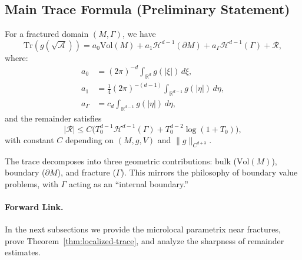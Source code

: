 \bigskip


\subsection{Main Trace Formula (Preliminary Statement)}

\begin{theorem}
\label{thm:localized-trace}
For a fractured domain $(M,\Gamma)$, we have
\[
\mathrm{Tr}(g(\sqrt{\mathcal{A}}))
= a_0 \mathrm{Vol}(M) + a_1 \mathcal{H}^{d-1}(\partial M)
+ a_\Gamma \mathcal{H}^{d-1}(\Gamma) + \mathcal{R},
\]
where:
\begin{align*}
a_0 &= (2\pi)^{-d} \int_{\mathbb{R}^d} g(|\xi|)\,d\xi, \\
a_1 &= \tfrac{1}{4}(2\pi)^{-(d-1)} \int_{\mathbb{R}^{d-1}} g(|\eta|)\,d\eta, \\
a_\Gamma &= c_d \int_{\mathbb{R}^{d-1}} g(|\eta|)\,d\eta,
\end{align*}
and the remainder satisfies
\[
|\mathcal{R}| \leq C\big(
T_0^{d-1} \mathcal{H}^{d-1}(\Gamma)
+ T_0^{d-2}\log(1+T_0)\big),
\]
with constant $C$ depending on $(M,g,V)$ and $\|g\|_{C^{d+3}}$.
\end{theorem}

\begin{remark}[Interpretation]
The trace decomposes into three geometric contributions:
bulk ($\mathrm{Vol}(M)$), boundary ($\partial M$), and fracture ($\Gamma$).
This mirrors the philosophy of boundary value problems,
with $\Gamma$ acting as an “internal boundary.”
\end{remark}

\bigskip


\paragraph{Forward Link.}
In the next subsections we provide the microlocal parametrix near
fractures, prove Theorem~\ref{thm:localized-trace}, and analyze
the sharpness of remainder estimates.


